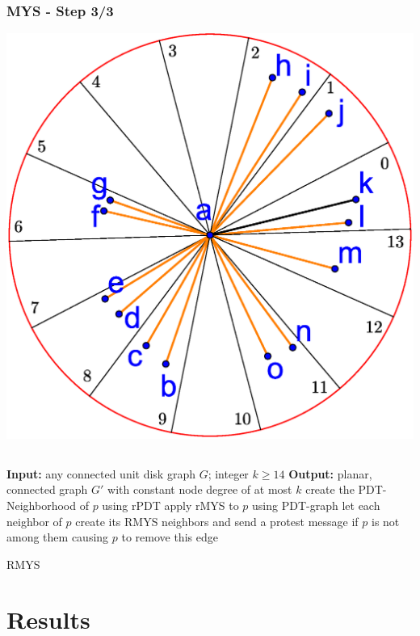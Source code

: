 \documentclass[compress]{beamer}
\begin{document}
\begin{frame} 
\frametitle{MYS - Step 3/3}
	\center \includegraphics[width=0.65\linewidth]{RMYS_3.eps}
\end{frame}

\subsection{}
\begin{frame}
\begin{algorithm}[H]
\begin{algorithmic}[0]
\STATE \textbf{Input:} any connected unit disk graph $G $; integer $k\geq 14 $
\STATE \textbf{Output:} planar, connected graph $G' $ with constant node degree of at most $k $
\STATE create the PDT-Neighborhood of $p $ using rPDT
\STATE apply rMYS to $p $ using PDT-graph
\STATE let each neighbor of $p $ create its RMYS neighbors and send a protest message if $p $ is not among them causing $p $ to remove this edge
\ENDFOR
\end{algorithmic}
\caption{RMYS}
\end{algorithm}
\end{frame}


\section{Results}
\end{document}
